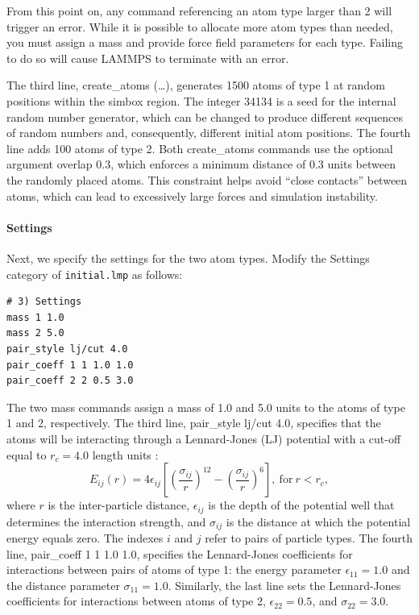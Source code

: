 \documentclass[9pt,tutorial]{livecoms}
\newcommand{\lmpcmd}[1]{\hspace{0pt}\colorbox{listing}{\textcolor{command}{\small{#1}}}\hspace{0pt}} %
\newcommand{\flecmd}[1]{\textcolor{command}{\texttt{#1}}} %
\begin{document}
\begin{note}
From this point on, any command referencing an atom type larger than 2
will trigger an error.  While it is possible to allocate more atom types
than needed, you must assign a mass and provide force field parameters for
each type.  Failing to do so will cause LAMMPS to terminate with an error.
\end{note}

The third line, \lmpcmd{create\_atoms (\dots)}, generates 1500 atoms of type
1 at random positions within the
\lmpcmd{simbox} region.  The integer 34134 is a seed for the
internal random number generator, which can be changed to produce different
sequences of random numbers and, consequently, different initial atom positions.
The fourth line adds 100 atoms of type 2.
Both \lmpcmd{create\_atoms} commands use the optional argument
\lmpcmd{overlap 0.3}, which enforces a minimum distance of 0.3
units between the randomly placed atoms.  This constraint helps avoid
``close contacts'' between atoms, which can lead to excessively
large forces and simulation instability.

\paragraph{Settings}

Next, we specify the settings for the two atom types.  Modify the
\lmpcmd{Settings} category of \flecmd{initial.lmp} as follows:
\begin{lstlisting}
# 3) Settings
mass 1 1.0
mass 2 5.0
pair_style lj/cut 4.0
pair_coeff 1 1 1.0 1.0
pair_coeff 2 2 0.5 3.0
\end{lstlisting}
The two \lmpcmd{mass} commands assign a mass of 1.0 and 5.0 units
to the atoms of type 1 and 2, respectively.  The third line,
\lmpcmd{pair\_style lj/cut 4.0}, specifies that the atoms
will be interacting through a Lennard-Jones (LJ) potential with a
cut-off equal to $r_c = 4.0$ length units \cite{wang2020lennard,fischer2023history}:
\begin{equation}
E_{ij} (r) = 4 \epsilon_{ij} \left[ \left( \dfrac{\sigma_{ij}}{r} \right)^{12}
  - \left( \dfrac{\sigma_{ij}}{r} \right)^{6} \right], ~ \text{for} ~ r < r_c,
\label{eq:LJ}
\end{equation}
where $r$ is the inter-particle distance, $\epsilon_{ij}$ is
the depth of the potential well that determines the interaction strength, and
$\sigma_{ij}$ is the distance at which the potential energy equals zero.
The indexes $i$ and $j$ refer to pairs of particle types.
The fourth line, \lmpcmd{pair\_coeff 1 1 1.0 1.0}, specifies the
Lennard-Jones coefficients for interactions between pairs of atoms
of type 1: the energy parameter $\epsilon_{11} = 1.0$ and
the distance parameter $\sigma_{11} = 1.0$.  Similarly, the last line
sets the Lennard-Jones coefficients for interactions between atoms
of type 2, $\epsilon_{22} = 0.5$, and $\sigma_{22} = 3.0$.
\end{document}
